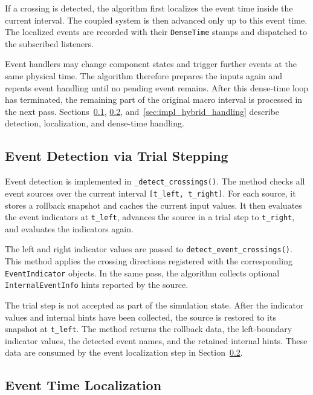 If a crossing is detected, the algorithm first localizes the event time inside the current interval.
The coupled system is then advanced only up to this event time.
The localized events are recorded with their \texttt{DenseTime} stamps and dispatched to the subscribed listeners.

Event handlers may change component states and trigger further events at the same physical time.
The algorithm therefore prepares the inputs again and repeats event handling until no pending event remains.
After this dense-time loop has terminated, the remaining part of the original macro interval is processed in the next pass.
Sections~\ref{sec:impl_hybrid_detection}, \ref{sec:impl_hybrid_localization}, and~\ref{sec:impl_hybrid_handling} describe detection, localization, and dense-time handling.

\subsection{Event Detection via Trial Stepping}
\label{sec:impl_hybrid_detection}

Event detection is implemented in \texttt{\_detect\_crossings()}.
The method checks all event sources over the current interval \texttt{[t\_left, t\_right]}.
For each source, it stores a rollback snapshot and caches the current input values.
It then evaluates the event indicators at \texttt{t\_left}, advances the source in a trial step to \texttt{t\_right}, and evaluates the indicators again.

The left and right indicator values are passed to \texttt{detect\_event\_crossings()}.
This method applies the crossing directions registered with the corresponding \texttt{EventIndicator} objects.
In the same pass, the algorithm collects optional \texttt{InternalEventInfo} hints reported by the source.

The trial step is not accepted as part of the simulation state.
After the indicator values and internal hints have been collected, the source is restored to its snapshot at \texttt{t\_left}.
The method returns the rollback data, the left-boundary indicator values, the detected event names, and the retained internal hints.
These data are consumed by the event localization step in Section~\ref{sec:impl_hybrid_localization}.

\subsection{Event Time Localization}
\label{sec:impl_hybrid_localization}

